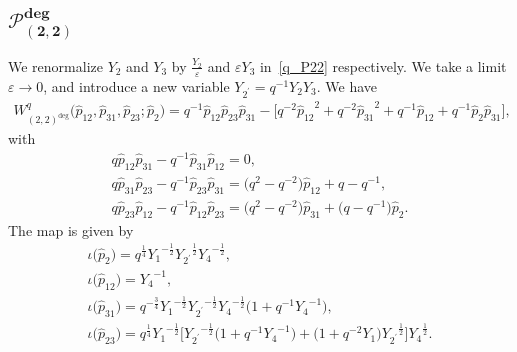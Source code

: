 \documentclass[pdftex]{sigma}
\numberwithin{equation}{section}
\begin{document}
\subsection[$\mathcal{P}_{(2,2)}^{\text{deg}}$]{$\boldsymbol{\mathcal{P}_{(2,2)}^{\text{deg}}}$}
We renormalize $Y_2$ and $Y_3$ by $\frac{Y_2}{\varepsilon}$ and $\varepsilon Y_3$ in~\eqref{q_P22} respectively. We take a limit $\varepsilon \to 0$, and introduce a new variable $Y_{2^\prime} = q^{-1} Y_2 Y_3$. We have
\begin{gather*}
 W^q_{(2,2)^{\text{deg}}}\big ( \hat{p}_{12}, \hat{p}_{31}, \hat{p}_{23}; \hat{p}_2 \big) = q^{-1} \hat{p}_{12} \hat{p}_{23} \hat{p}_{31} - \big[ q^{-2} {\hat{p}_{12}}^{2} +q^{-2} {\hat{p}_{31}}^{2} + q^{-1} \hat{p}_{12} + q^{-1} \hat{p}_2 \hat{p}_{31}\big] ,
\end{gather*}
with
\begin{gather*}
q \hat{p}_{12} \hat{p}_{31} - q^{-1} \hat{p}_{31} \hat{p}_{12} =0 , \\
q \hat{p}_{31} \hat{p}_{23} - q^{-1} \hat{p}_{23} \hat{p}_{31} = \big(q^2 - q^{-2}\big) \hat{p}_{12} + q-q^{-1} , \\
q \hat{p}_{23} \hat{p}_{12} - q^{-1} \hat{p}_{12} \hat{p}_{23} = \big(q^2 - q^{-2}\big) \hat{p}_{31} + \big(q-q^{-1}\big) \hat{p}_2 .
\end{gather*}
The map is given by
\begin{gather*}
\iota\big(\hat{p}_2\big) = q^{\frac{1}{4}} {Y_1}^{-\frac{1}{2}} {Y_{2^\prime}}^{\frac{1}{2}} {Y_4}^{-\frac{1}{2} } , \\
\iota\big(\hat{p}_{12}\big) = {Y_4}^{-1} , \\
\iota\big(\hat{p}_{31}\big) = q^{-\frac{3}{4}} {Y_1}^{-\frac{1}{2}} {Y_{2^\prime}}^{-\frac{1}{2}} {Y_4}^{-\frac{1}{2}}\big( 1 + q^{-1} {Y_4}^{-1}\big) , \\
\iota\big(\hat{p}_{23}\big) = q^{\frac{1}{4}} {Y_1}^{-\frac{1}{2}} \big[ {Y_{2^\prime}}^{-\frac{1}{2}} \big( 1 + q^{-1} {Y_4}^{-1}\big) + \big( 1+q^{-2} Y_1\big) {Y_{2^\prime}}^{\frac{1}{2}}\big] {Y_4}^{\frac{1}{2}} .
\end{gather*}
\end{document}
